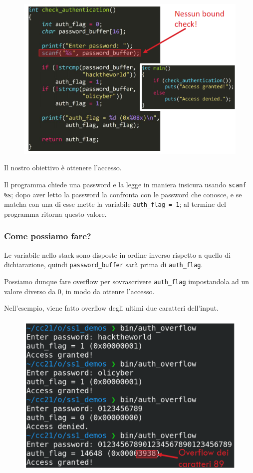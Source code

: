 \begin{figure}[ht]
    \centering
    \includegraphics[width=0.75\linewidth]{images/primo-of.png}
\end{figure}

Il nostro obiettivo è ottenere l'accesso.

Il programma chiede una password e la legge in maniera insicura usando
\texttt{scanf \%s}; dopo aver letto la password la confronta con le password che conosce,
e se matcha con una di esse mette la variabile \texttt{auth\_flag = 1}; al 
termine del programma ritorna questo valore.

\subsubsection{Come possiamo fare?}
Le variabile nello stack sono disposte in ordine inverso rispetto a quello
di dichiarazione, quindi \texttt{password\_buffer} sarà prima di \texttt{auth\_flag}.

Possiamo dunque fare overflow per sovrascrivere \texttt{auth\_flag} impostandola ad un valore
diverso da 0, in modo da ottenre l'accesso.

Nell'esempio, viene fatto overflow degli ultimi due caratteri dell'input.

\begin{figure}[ht]
    \centering
    \includegraphics[width=0.75\linewidth]{images/primo-of2.png}
\end{figure}














